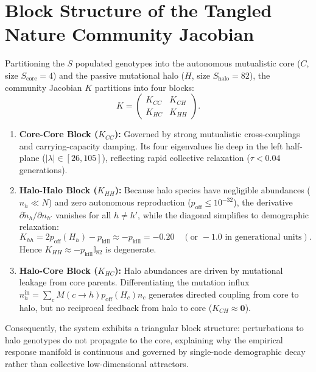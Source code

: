 \section{Block Structure of the Tangled Nature Community Jacobian}
\label{app:t41_jacobian_blocks}
Partitioning the $S$ populated genotypes into the autonomous mutualistic core ($C$, size $S_{\text{core}} = 4$) and the passive mutational halo ($H$, size $S_{\text{halo}} = 82$), the community Jacobian $K$ partitions into four blocks:
\begin{equation}
K = \begin{pmatrix}
K_{CC} & K_{CH} \\
K_{HC} & K_{HH}
\end{pmatrix}.
\end{equation}
\begin{enumerate}[label=(\roman*)]
\item \textbf{Core-Core Block ($K_{CC}$):} Governed by strong mutualistic cross-couplings and carrying-capacity damping. Its four eigenvalues lie deep in the left half-plane ($|\lambda| \in [26, 105]$), reflecting rapid collective relaxation ($\tau < 0.04$ generations).
\item \textbf{Halo-Halo Block ($K_{HH}$):} Because halo species have negligible abundances ($n_h \ll N$) and zero autonomous reproduction ($p_{\text{off}} \le 10^{-32}$), the derivative $\partial \dot{n}_h / \partial n_{h'}$ vanishes for all $h \neq h'$, while the diagonal simplifies to demographic relaxation:
\begin{equation}
K_{hh} = 2 p_{\text{off}}(H_h) - p_{\text{kill}} \approx -p_{\text{kill}} = -0.20 \quad (\text{or } -1.0 \text{ in generational units}).
\end{equation}
Hence $K_{HH} \approx -p_{\text{kill}} \mathbb{I}_{82}$ is degenerate.
\item \textbf{Halo-Core Block ($K_{HC}$):} Halo abundances are driven by mutational leakage from core parents. Differentiating the mutation influx $n_h^{\text{in}} = \sum_{c} M(c \to h) p_{\text{off}}(H_c) n_c$ generates directed coupling from core to halo, but no reciprocal feedback from halo to core ($K_{CH} \approx \mathbf{0}$).
\end{enumerate}
Consequently, the system exhibits a triangular block structure: perturbations to halo genotypes do not propagate to the core, explaining why the empirical response manifold is continuous and governed by single-node demographic decay rather than collective low-dimensional attractors.
